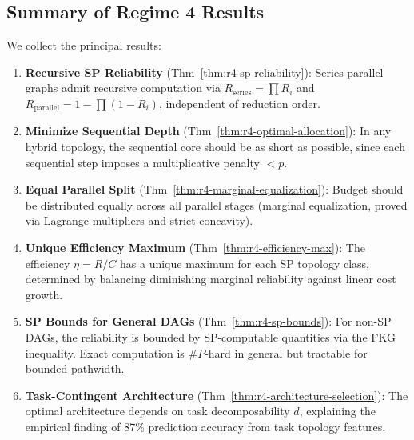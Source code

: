 \subsection{Summary of Regime 4 Results}

We collect the principal results:

\begin{enumerate}
  \item \textbf{Recursive SP Reliability} (Thm~\ref{thm:r4-sp-reliability}):
    Series-parallel graphs admit recursive computation via
    $R_{\mathrm{series}} = \prod R_i$ and $R_{\mathrm{parallel}} = 1 - \prod(1-R_i)$,
    independent of reduction order.

  \item \textbf{Minimize Sequential Depth} (Thm~\ref{thm:r4-optimal-allocation}):
    In any hybrid topology, the sequential core should be as short as possible,
    since each sequential step imposes a multiplicative penalty $< p$.

  \item \textbf{Equal Parallel Split} (Thm~\ref{thm:r4-marginal-equalization}):
    Budget should be distributed equally across all parallel stages
    (marginal equalization, proved via Lagrange multipliers and strict concavity).

  \item \textbf{Unique Efficiency Maximum} (Thm~\ref{thm:r4-efficiency-max}):
    The efficiency $\eta = R/C$ has a unique maximum for each SP topology class,
    determined by balancing diminishing marginal reliability against linear cost growth.

  \item \textbf{SP Bounds for General DAGs} (Thm~\ref{thm:r4-sp-bounds}):
    For non-SP DAGs, the reliability is bounded by SP-computable quantities
    via the FKG inequality.  Exact computation is $\#P$-hard in general but
    tractable for bounded pathwidth.

  \item \textbf{Task-Contingent Architecture} (Thm~\ref{thm:r4-architecture-selection}):
    The optimal architecture depends on task decomposability $d$, explaining
    the empirical finding of 87\% prediction accuracy from task topology features.
\end{enumerate}
